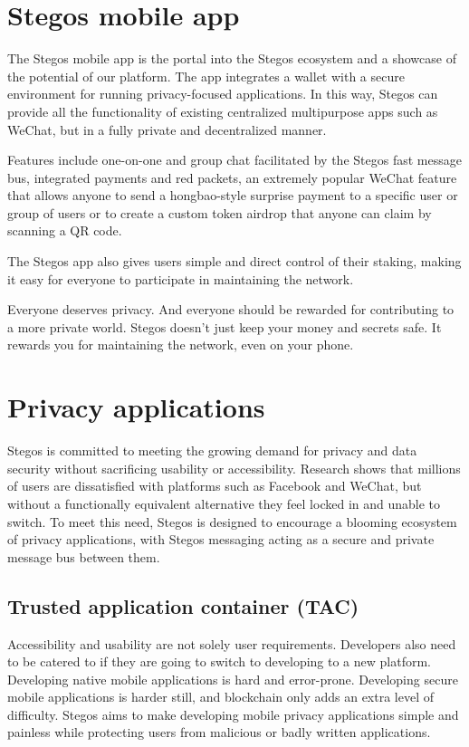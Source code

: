 \documentclass[8pt,fleqn,openany]{book}
\begin{document}
\section{Stegos mobile app}
The Stegos mobile app is the portal into the Stegos ecosystem and a showcase of the potential of our platform. The app integrates a wallet with a secure environment for running privacy-focused applications. In this way, Stegos can provide all the functionality of existing centralized multipurpose apps such as WeChat, but in a fully private and decentralized manner. 

Features include one-on-one and group chat facilitated by the Stegos fast message bus, integrated payments and red packets, an extremely popular WeChat feature that allows anyone to send a hongbao-style surprise payment to a specific user or group of users or to create a custom token airdrop that anyone can claim by scanning a QR code.

The Stegos app also gives users simple and direct control of their staking, making it easy for everyone to participate in maintaining the network. 

Everyone deserves privacy. And everyone should be rewarded for contributing to a more private world. Stegos doesn’t just keep your money and secrets safe. It rewards you for maintaining the network, even on your phone.

\section{Privacy applications}
Stegos is committed to meeting the growing demand for privacy and data security without sacrificing usability or accessibility. Research shows that millions of users are dissatisfied with platforms such as Facebook and WeChat, but without a functionally equivalent alternative they feel locked in and unable to switch. To meet this need, Stegos is designed to encourage a blooming ecosystem of privacy applications, with Stegos messaging acting as a secure and private message bus between them.      

\subsection{Trusted application container (TAC)}
Accessibility and usability are not solely user requirements. Developers also need to be catered to if they are going to switch to developing to a new platform. Developing native mobile applications is hard and error-prone. Developing secure mobile applications is harder still, and blockchain only adds an extra level of difficulty. Stegos aims to make developing mobile privacy applications simple and painless while protecting users from malicious or badly written applications. 
\end{document}
